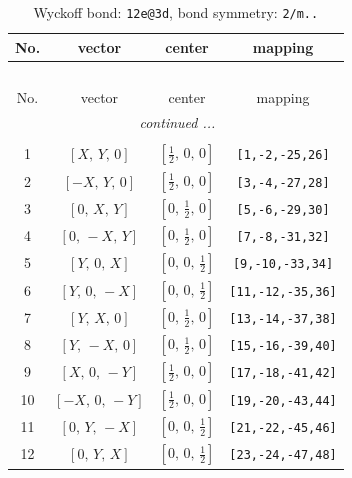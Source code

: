 \documentclass[fleqn,8pt]{jsarticle}
\begin{document}
\renewcommand{\arraystretch}{1.2}
\begin{longtable}{cccc}
\caption{Wyckoff bond: {\tt 12e@3d}, bond symmetry: {\tt 2/m..}}
 \\
 \hline \hline
No. & vector & center & mapping \\ \hline \endfirsthead

\multicolumn{3}{l}{\tablename\ \thetable{}} \\
 \hline \hline
No. & vector & center & mapping \\ \hline \endhead

 \hline \hline
\multicolumn{3}{r}{\footnotesize\it continued ...} \\ \endfoot

 \hline \hline
\multicolumn{3}{r}{} \\ \endlastfoot

1 & $\left[ X,\, Y,\, 0 \right]$ & $\left[ \frac{1}{2},\, 0,\, 0 \right]$ & {\tt [1,-2,-25,26]} \\ \hline
2 & $\left[ - X,\, Y,\, 0 \right]$ & $\left[ \frac{1}{2},\, 0,\, 0 \right]$ & {\tt [3,-4,-27,28]} \\ \hline
3 & $\left[ 0,\, X,\, Y \right]$ & $\left[ 0,\, \frac{1}{2},\, 0 \right]$ & {\tt [5,-6,-29,30]} \\ \hline
4 & $\left[ 0,\, - X,\, Y \right]$ & $\left[ 0,\, \frac{1}{2},\, 0 \right]$ & {\tt [7,-8,-31,32]} \\ \hline
5 & $\left[ Y,\, 0,\, X \right]$ & $\left[ 0,\, 0,\, \frac{1}{2} \right]$ & {\tt [9,-10,-33,34]} \\ \hline
6 & $\left[ Y,\, 0,\, - X \right]$ & $\left[ 0,\, 0,\, \frac{1}{2} \right]$ & {\tt [11,-12,-35,36]} \\ \hline
7 & $\left[ Y,\, X,\, 0 \right]$ & $\left[ 0,\, \frac{1}{2},\, 0 \right]$ & {\tt [13,-14,-37,38]} \\ \hline
8 & $\left[ Y,\, - X,\, 0 \right]$ & $\left[ 0,\, \frac{1}{2},\, 0 \right]$ & {\tt [15,-16,-39,40]} \\ \hline
9 & $\left[ X,\, 0,\, - Y \right]$ & $\left[ \frac{1}{2},\, 0,\, 0 \right]$ & {\tt [17,-18,-41,42]} \\ \hline
10 & $\left[ - X,\, 0,\, - Y \right]$ & $\left[ \frac{1}{2},\, 0,\, 0 \right]$ & {\tt [19,-20,-43,44]} \\ \hline
11 & $\left[ 0,\, Y,\, - X \right]$ & $\left[ 0,\, 0,\, \frac{1}{2} \right]$ & {\tt [21,-22,-45,46]} \\ \hline
12 & $\left[ 0,\, Y,\, X \right]$ & $\left[ 0,\, 0,\, \frac{1}{2} \right]$ & {\tt [23,-24,-47,48]} \\
\end{longtable}
\end{document}
